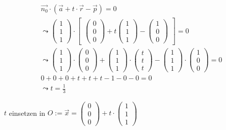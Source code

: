 \begin{gather}
\vec{n_0} \cdot (\vec{a}+t\cdot \vec{r}-\vec{p})=0\\
\leadsto 
\begin{pmatrix}
1\\1\\1
\end{pmatrix} \cdot 
\begin{bmatrix}
\begin{pmatrix}
0\\0\\0
\end{pmatrix}
+ t
\begin{pmatrix}
1\\1\\1
\end{pmatrix}
-
\begin{pmatrix}
1\\0\\0
\end{pmatrix}
\end{bmatrix} = 0\\
\leadsto
\begin{pmatrix}
1\\1\\1
\end{pmatrix}\cdot
\begin{pmatrix}
0\\0\\0
\end{pmatrix}
+
\begin{pmatrix}
1\\1\\1
\end{pmatrix}
\cdot
\begin{pmatrix}
t\\t\\t
\end{pmatrix}
-
\begin{pmatrix}
1\\1\\1
\end{pmatrix}
\cdot
\begin{pmatrix}
1\\0\\0
\end{pmatrix} =0\\
0+0+0+t+t+t-1-0-0=0\\
\leadsto t= \frac{1}{3}
\end{gather}

\ensuremath{t} einsetzen in \ensuremath{O:= \vec{x}=\begin{pmatrix}
		0\\0\\0
	\end{pmatrix} +t\cdot\begin{pmatrix}
		1\\1\\1
\end{pmatrix}}\\


